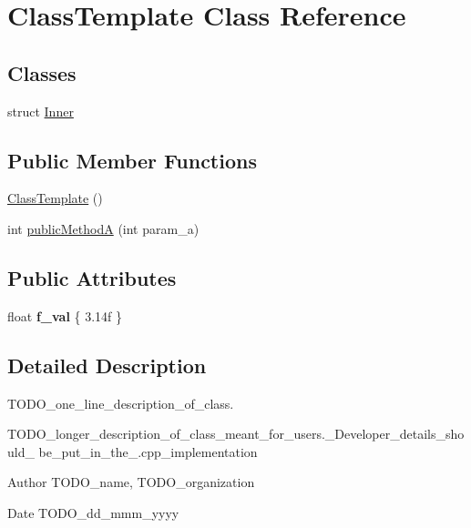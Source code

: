 \hypertarget{class_class_template}{}\section{Class\+Template Class Reference}
\label{class_class_template}
\subsection*{Classes}
\begin{DoxyCompactItemize}
\item 
struct \mbox{\hyperlink{struct_class_template_1_1_inner}{Inner}}
\end{DoxyCompactItemize}
\subsection*{Public Member Functions}
\begin{DoxyCompactItemize}
\item 
\mbox{\hyperlink{class_class_template_adfe87f94a240d35f2e8b3798cf4459a8}{Class\+Template}} ()
\item 
int \mbox{\hyperlink{class_class_template_aa55e63ab656cc1e2930028cb6b065cdb}{public\+MethodA}} (int param\+\_\+a)
\end{DoxyCompactItemize}
\subsection*{Public Attributes}
\begin{DoxyCompactItemize}
\item 
\mbox{\label{class_class_template_a2e86f0220801f0e4a4208004d606554f}} 
float {\bfseries f\+\_\+val} \{ 3.\+14f \}
\end{DoxyCompactItemize}


\subsection{Detailed Description}
T\+O\+D\+O\+\_\+one\+\_\+line\+\_\+description\+\_\+of\+\_\+class.

T\+O\+D\+O\+\_\+longer\+\_\+description\+\_\+of\+\_\+class\+\_\+meant\+\_\+for\+\_\+users.\+\_\+\+Developer\+\_\+details\+\_\+should\+\_\+ be\+\_\+put\+\_\+in\+\_\+the\+\_\+.\+cpp\+\_\+implementation

\begin{DoxyAuthor}{Author}
T\+O\+D\+O\+\_\+name, T\+O\+D\+O\+\_\+organization 
\end{DoxyAuthor}
\begin{DoxyDate}{Date}
T\+O\+D\+O\+\_\+dd\+\_\+mmm\+\_\+yyyy 
\end{DoxyDate}


